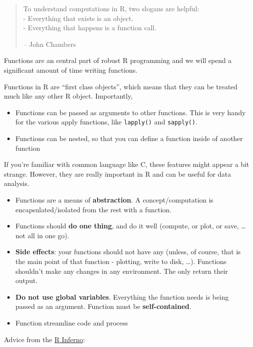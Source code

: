 \documentclass[]{book}
\providecommand{\tightlist}{%
  \setlength{\itemsep}{0pt}\setlength{\parskip}{0pt}}
\theoremstyle{definition}
\theoremstyle{definition}
\theoremstyle{definition}
\theoremstyle{remark}
\begin{document}
\begin{quote}
To understand computations in R, two slogans are helpful:\\
- Everything that exists is an object.\\
- Everything that happens is a function call.

-- John Chambers
\end{quote}

Functions are an central part of robust R programming and we will spend
a significant amount of time writing functions.

Functions in R are ``first class objects'', which means that they can be
treated much like any other R object. Importantly,

\begin{itemize}
\item
  Functions can be passed as arguments to other functions. This is very
  handy for the various apply functions, like \texttt{lapply()} and
  \texttt{sapply()}.
\item
  Functions can be nested, so that you can define a function inside of
  another function
\end{itemize}

If you're familiar with common language like C, these features might
appear a bit strange. However, they are really important in R and can be
useful for data analysis.

\begin{itemize}
\tightlist
\item
  Functions are a means of \textbf{abstraction}. A concept/computation
  is encapsulated/isolated from the rest with a function.
\item
  Functions should \textbf{do one thing}, and do it well (compute, or
  plot, or save, \ldots{} not all in one go).
\item
  \textbf{Side effects}: your functions should not have any (unless, of
  course, that is the main point of that function - plotting, write to
  disk, \ldots{}). Functions shouldn't make any changes in any
  environment. The only return their output.
\item
  \textbf{Do not use global variables}. Everything the function needs is
  being passed as an argument. Function must be \textbf{self-contained}.
\item
  Function streamline code and process
\end{itemize}

Advice from the
\href{http://www.burns-stat.com/pages/Tutor/R_inferno.pdf}{R Inferno}:
\end{document}
